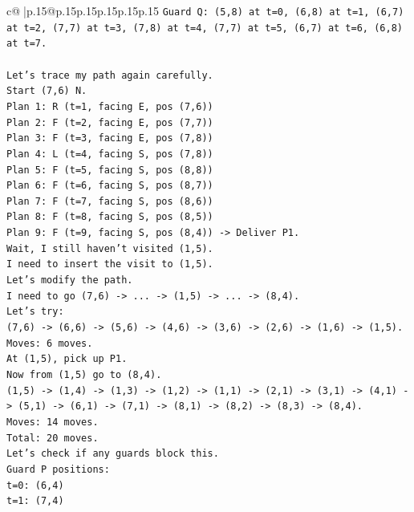 \documentclass{article}
\begin{document}
{\begin{supertabular}{c@{$\;$}|p{.15\linewidth}@{}p{.15\linewidth}p{.15\linewidth}p{.15\linewidth}p{.15\linewidth}p{.15\linewidth}}
{{{\texttt{Guard Q: (5,8) at t=0, (6,8) at t=1, (6,7) at t=2, (7,7) at t=3, (7,8) at t=4, (7,7) at t=5, (6,7) at t=6, (6,8) at t=7.} \\
\\ 
\texttt{Let's trace my path again carefully.} \\
\texttt{Start (7,6) N.} \\
\texttt{Plan 1: R (t=1, facing E, pos (7,6))} \\
\texttt{Plan 2: F (t=2, facing E, pos (7,7))} \\
\texttt{Plan 3: F (t=3, facing E, pos (7,8))} \\
\texttt{Plan 4: L (t=4, facing S, pos (7,8))} \\
\texttt{Plan 5: F (t=5, facing S, pos (8,8))} \\
\texttt{Plan 6: F (t=6, facing S, pos (8,7))} \\
\texttt{Plan 7: F (t=7, facing S, pos (8,6))} \\
\texttt{Plan 8: F (t=8, facing S, pos (8,5))} \\
\texttt{Plan 9: F (t=9, facing S, pos (8,4)) {-}> Deliver P1.} \\
\texttt{Wait, I still haven't visited (1,5).} \\
\texttt{I need to insert the visit to (1,5).} \\
\texttt{Let's modify the path.} \\
\texttt{I need to go (7,6) {-}> ... {-}> (1,5) {-}> ... {-}> (8,4).} \\
\texttt{Let's try:} \\
\texttt{(7,6) {-}> (6,6) {-}> (5,6) {-}> (4,6) {-}> (3,6) {-}> (2,6) {-}> (1,6) {-}> (1,5).} \\
\texttt{Moves: 6 moves.} \\
\texttt{At (1,5), pick up P1.} \\
\texttt{Now from (1,5) go to (8,4).} \\
\texttt{(1,5) {-}> (1,4) {-}> (1,3) {-}> (1,2) {-}> (1,1) {-}> (2,1) {-}> (3,1) {-}> (4,1) {-}> (5,1) {-}> (6,1) {-}> (7,1) {-}> (8,1) {-}> (8,2) {-}> (8,3) {-}> (8,4).} \\
\texttt{Moves: 14 moves.} \\
\texttt{Total: 20 moves.} \\
\texttt{Let's check if any guards block this.} \\
\texttt{Guard P positions:} \\
\texttt{t=0: (6,4)} \\
\texttt{t=1: (7,4)} \\
}}}
\end{supertabular}}
\end{document}
